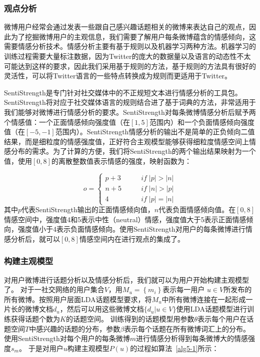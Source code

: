 \subsubsection{观点分析}
\label{sentiment}
微博用户经常会通过发表一些跟自己感兴趣话题相关的微博来表达自己的观点，因此为了挖掘微博用户的主观信息，我们需要了解用户每条微博蕴含的情感倾向，这需要情感分析技术。情感分析主要有基于规则以及机器学习两种方法。机器学习的训练过程需要大量标注数据，因为Twitter的庞大的数据量以及语言的动态性不太可能达到这样的要求，因此我们采用基于规则的方法，基于规则的方法具有很好的灵活性，可以将Twitter语言的一些特点转换成为规则而更适用于Twitter。

SentiStrength是专门针对社交媒体中的不正规短文本进行情感分析的工具包。SentiStrength将对应于社交媒体语言的规则结合进了基于词典的方法，非常适用于我们能够对微博进行情感分析的要求。SentiStrength对每条微博情感分析后赋予两个情感值：一个正面情感倾向强度值（在$ [1,5] $范围内）和一个负面情感倾向强度值（在$ [-5,-1] $范围内）。SentiStrength情感分析的输出不是简单的正负倾向二值结果，而是细粒度的情感强度值，正好符合主观模型能够获得细粒度情感空间上情感分布的需求。为了计算的方便，我们将SentiStrength的两个输出结果映射为一个值，使用$ [0, 8] $的离散整数值表示情感的强度，映射函数为：

\begin{equation}
\label{opinionmap}
o=\begin{cases} 
{p+3} &  \qquad if \; \vert p \vert > \vert n \vert \\
{n+5} &  \qquad if \; \vert n \vert > \vert p \vert \\
{4}  &   \qquad if \; \vert p \vert = \vert n \vert
\end{cases}
\end{equation}
其中$ p $代表SentiStrength输出的正面情感倾向值，$ n $代表负面情感倾向值。在$ [0, 8] $情感空间中，强度值4和5表示中性（neutral）情感，强度值大于5表示正面情感倾向，强度值小于4表示负面情感倾向。使用SentiStrength对用户的每条微博进行情感分析后，就可以$ [0, 8] $情感空间内在进行观点的集成了。

\subsubsection{构建主观模型}
\label{concrete}
对用户微博进行话题分析以及情感分析后，我们就可以为用户开始构建主观模型了。
对于一社交网络的用户集合$ V $，用$ M_{u}=\left\lbrace m_{i} \right\rbrace$表示每一用户 $ u \in V $所发布的所有微博。按照用户层面LDA话题模型要求，将$ M_{u} $中所有微博连接在一起形成一片长的微博文档$ d_{u} $，然后可以用这些微博文档$\{ d_{u}|u \in V\} $使用LDA话题模型进行训练获得话题个数为$ K $的话题空间。
训练得到的话题模型用参数$ \theta $表示每个用户在话题空间$ T $中感兴趣的话题的分布，参数$ \beta $表示每个话题在所有微博词汇上的分布。
使用SentiStrength对每个用户的每条微博$ m $进行情感分析得到每条微博大的情感强度$ s_{m} $。
于是对用户$ u $构建主观模型$ P(u) $的过程如算法~\ref{alg5-1}所示：

